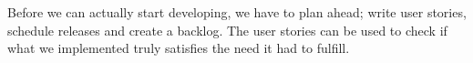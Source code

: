 Before we can actually start developing, we have to plan ahead; write user stories, schedule releases and create a backlog. The user stories can be used to check if what we implemented truly satisfies the need it had to fulfill.